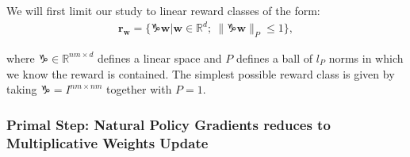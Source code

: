 We will first limit our study to linear reward classes of the form:
\begin{align*}
    \bm{r}_{\bm{w}} = \Big\{ \capricornus \bm{w} \Big| \bm{w}  \in \mathbb{R}^d ;~ \| \capricornus \bm{w} \|_P \leq 1 \Big\},
\end{align*}

where $\capricornus \in \mathbb{R}^{nm \times d}$ defines a linear space and $P$ defines a ball of $l_P$ norms in which we know the reward is contained. The simplest possible reward class is given by taking $\capricornus = I^{nm\times nm}$ together with $P=1$.


\subsubsection{Primal Step: Natural Policy Gradients reduces to Multiplicative Weights Update} 

